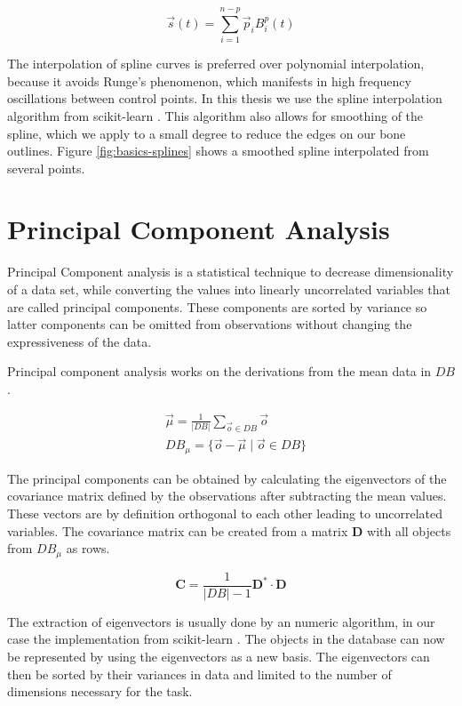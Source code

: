 \documentclass[pdftex,12pt,a4paper]{report}
\begin{document}
\begin{equation}
\vec{s}(t) =  \sum_{i=1}^{n-p} \vec{p}_i B_i^p(t)
\end{equation}

The interpolation of spline curves is preferred over polynomial interpolation, because it avoids Runge's phenomenon, which manifests in high frequency oscillations between control points. In this thesis we use the spline interpolation algorithm from scikit-learn \cite{pedregosa2011scikit}. This algorithm also allows for smoothing of the spline, which we apply to a small degree to reduce the edges on our bone outlines. Figure \ref{fig:basics-splines} shows a smoothed spline interpolated from several points.

\section{Principal Component Analysis}
\label{section:pca}

Principal Component analysis is a statistical technique to decrease dimensionality of a data set, while converting the values into linearly uncorrelated variables that are called principal components. These components are sorted by variance so latter components can be omitted from observations without changing the expressiveness of the data.

Principal component analysis works on the derivations from the mean data in $DB$.

\begin{equation}
\begin{split}
& \vec{\mu} = \frac{1}{|DB|} \sum_{\vec{o} \in DB}  \vec{o} \\
& DB_\mu = \{ \vec{o} - \vec{\mu} \mid \vec{o} \in DB \}
\end{split}
\end{equation}

The principal components can be obtained by calculating the eigenvectors of the covariance matrix defined by the observations after subtracting the mean values. These vectors are by definition orthogonal to each other leading to uncorrelated variables. The covariance matrix can  be created from a matrix $\mathbf{D}$ with all objects from $DB_\mu$ as rows.

\begin{equation}
\mathbf{C} = \frac{1}{|DB|-1} \mathbf{D}^* \cdot \mathbf{D}
\end{equation}

The extraction of eigenvectors is usually done by an numeric algorithm, in our case the implementation from scikit-learn \cite{pedregosa2011scikit}. The objects in the database can now be represented by using the eigenvectors as a new basis. The eigenvectors can then be sorted by their variances in data and limited to the number of dimensions necessary for the task.
\end{document}

